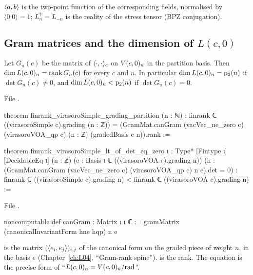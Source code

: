 \begin{physics}
$\langle a,b\rangle$ is the two-point function of the corresponding fields, normalised by
$\langle0|0\rangle = 1$; $L_n^\dagger = L_{-n}$ is the reality of the stress tensor (BPZ conjugation).
\end{physics}

\subsection{Gram matrices and the dimension of \texorpdfstring{$L(c,0)$}{L(c,0)}}

\begin{theorem}\label{l06:thm:dimrank}
Let $G_n(c)$ be the matrix of $\langle \cdot,\cdot\rangle_c$ on $V(c,0)_n$ in the partition basis. Then
$\dim L(c,0)_n = \operatorname{rank}G_n(c)$ for every $c$ and $n$. In particular $\dim L(c,0)_n =
\mathrm{p}_{2}(n)$ if $\det G_n(c)\ne0$, and $\dim L(c,0)_n<\mathrm{p}_{2}(n)$ if $\det G_n(c) = 0$.
\end{theorem}

File .
\begin{leancode}
theorem finrank_virasoroSimple_grading_partition (n : ℕ) :
    finrank ℂ ((virasoroSimple c).grading (n : ℤ))
      = (GramMat.canGram (vacVec_ne_zero c) (virasoroVOA_qp c) (n : ℤ)
          (gradedBasis c n)).rank :=

theorem finrank_virasoroSimple_lt_of_det_eq_zero {ι : Type*} [Fintype ι] [DecidableEq ι] (n : ℤ)
    (e : Basis ι ℂ ((virasoroVOA c).grading n))
    (h : (GramMat.canGram (vacVec_ne_zero c) (virasoroVOA_qp c) n e).det = 0) :
    finrank ℂ ((virasoroSimple c).grading n) < finrank ℂ ((virasoroVOA c).grading n) :=
\end{leancode}
File .
\begin{leancode}
noncomputable def canGram : Matrix ι ι ℂ := gramMatrix (canonicalInvariantForm hne hqp) n e
\end{leancode}

\begin{dictionary}
\allowbreak{} is the matrix $(\langle e_i,e_j\rangle)_{i,j}$ of the canonical form on
the graded piece of weight $n$, in the basis $e$ (Chapter~\ref{ch:L04}, ``Gram-rank spine'').
 is the rank. The equation is the precise form of ``$L(c,0)_n = V(c,0)_n/\mathrm{rad}$''.
\end{dictionary}

